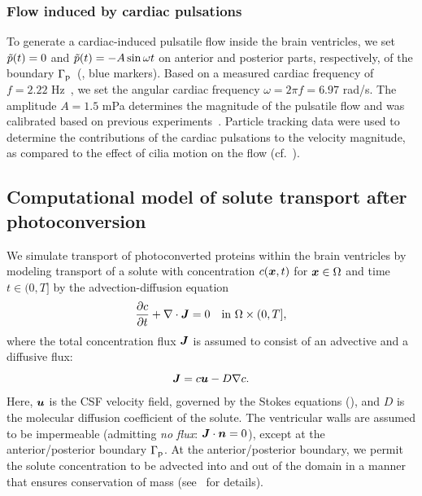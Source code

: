 \documentclass{WileyMSP-template}
\begin{document}
\subsubsection{Flow induced by cardiac pulsations}
To generate a cardiac-induced pulsatile flow inside the brain ventricles, we set $\Tilde{p}(t)=0$ and
$\Tilde{p}(t)=-A\sin{\omega t}$ on anterior and posterior parts, respectively, of the
boundary $\Gamma_{\mathrm{p}}$~(, blue markers).
Based on a measured cardiac frequency of $f=2.22$ Hz~\cite{Olstad2019CiliaryDevelopment},
we set the angular cardiac frequency $\omega=2\pi f=6.97$ rad/s. The amplitude $A=1.5$ mPa determines the magnitude of the pulsatile flow
and was calibrated based on previous experiments~\cite{Olstad2019CiliaryDevelopment}.
Particle tracking data were used to determine the contributions of the
cardiac pulsations to the velocity magnitude,
as compared to the effect of cilia motion on the flow (cf.~).

\subsection{Computational model of solute transport after photoconversion}
We simulate transport of photoconverted proteins within the brain ventricles by
modeling transport of a solute with concentration $c(\bm{x}, t)$ for $\bm{x}\in\Omega$ and
time $t\in(0, T]$ by the advection-diffusion equation
\begin{equation}
    \frac{\partial c}{\partial t} + \nabla\cdot\bm{J} = 0 \quad \text{in } \Omega\times(0, T],
    \label{eq:adv_diff_strong}
\end{equation}
where the total concentration flux $\bm{J}$ is assumed to consist of an advective and a diffusive flux:
\begin{equation*}
    \bm{J} = c\bm{u} - D\nabla c .
\end{equation*}
Here, $\bm{u}$ is the CSF velocity field, governed by the Stokes equations (),
and $D$ is the molecular diffusion coefficient of the solute. 
The ventricular walls are assumed to be impermeable (admitting \emph{no flux}: $\bm{J}\cdot\bm{n}=0$),
except at the anterior/posterior boundary $\Gamma_{\mathrm{p}}$.
At the anterior/posterior boundary, we permit the solute concentration to be advected into
and out of the domain in a manner that ensures conservation of mass
(see~ for details).
\end{document}
